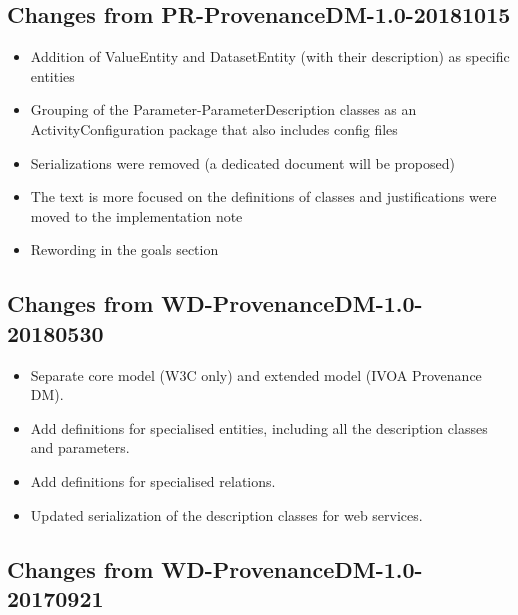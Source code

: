 
\subsection{Changes from PR-ProvenanceDM-1.0-20181015}

\begin{itemize}
\item Addition of ValueEntity and DatasetEntity (with their description) as specific entities
\item Grouping of the Parameter-ParameterDescription classes as an ActivityConfiguration package that also includes config files
\item Serializations were removed (a dedicated document will be proposed)
\item The text is more focused on the definitions of classes and justifications were moved to the implementation note
\item Rewording in the goals section
\end{itemize}


\subsection{Changes from WD-ProvenanceDM-1.0-20180530}

\begin{itemize}
\item Separate core model (W3C only) and extended model (IVOA Provenance DM).
\item Add definitions for specialised entities, including all the description classes and parameters.
\item Add definitions for specialised relations.
\item Updated serialization of the description classes for web services.
\end{itemize}


\subsection{Changes from WD-ProvenanceDM-1.0-20170921}

